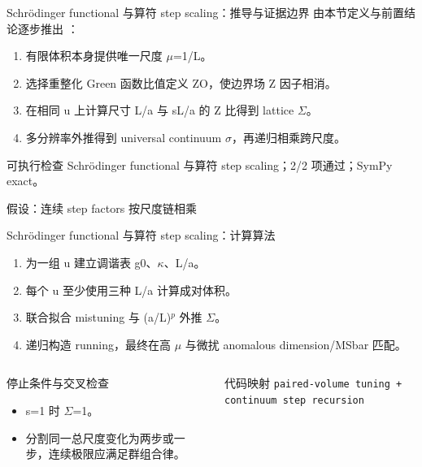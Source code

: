 \begin{frame}[t]{Schrödinger functional 与算符 step scaling：推导与证据边界}
\footnotesize
{}\quad 由本节定义与前置结论逐步推出 ：
\begin{enumerate}
\item 有限体积本身提供唯一尺度 \ensuremath{\mu}=1/\allowbreak{}L。
\item 选择重整化 Green 函数比值定义 ZO，使边界场 Z 因子相消。
\item 在相同 u 上计算尺寸 L/\allowbreak{}a 与 sL/\allowbreak{}a 的 Z 比得到 lattice \ensuremath{\Sigma}。
\item 多分辨率外推得到 universal continuum \ensuremath{\sigma}，再递归相乘跨尺度。
\end{enumerate}\begin{block}{可执行检查}
\quad Schrödinger functional 与算符 step scaling；2/2 项通过；SymPy exact。
\par\scriptsize 假设：连续 step factors 按尺度链相乘
\end{block}
\end{frame}

\begin{frame}[t]{Schrödinger functional 与算符 step scaling：计算算法}
\footnotesize
{}\begin{enumerate}
\item 为一组 u 建立调谐表 g0、\ensuremath{\kappa}、L/\allowbreak{}a。
\item 每个 u 至少使用三种 L/\allowbreak{}a 计算成对体积。
\item 联合拟合 mistuning 与 (a/\allowbreak{}L)\ensuremath{^{p}} 外推 \ensuremath{\Sigma}。
\item 递归构造 running，最终在高 \ensuremath{\mu} 与微扰 anomalous dimension/\allowbreak{}MSbar 匹配。
\end{enumerate}\begin{columns}[T,onlytextwidth]
\begin{block}{停止条件与交叉检查}\scriptsize\begin{itemize}
\item[\CheckMark] s=1 时 \ensuremath{\Sigma}=1。
\item[\CheckMark] 分割同一总尺度变化为两步或一步，连续极限应满足群组合律。
\end{itemize}\end{block}
\begin{block}{代码映射}
\scriptsize \texttt{paired-volume tuning + continuum step recursion}
\end{block}\end{columns}\end{frame}

